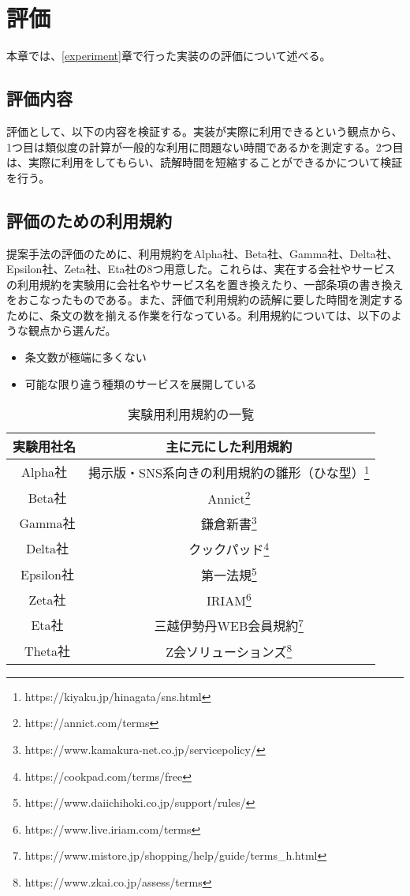 \chapter{評価}
\label{discussion}
本章では、\ref{experiment}章で行った実装のの評価について述べる。

\section{評価内容}
評価として、以下の内容を検証する。実装が実際に利用できるという観点から、1つ目は類似度の計算が一般的な利用に問題ない時間であるかを測定する。2つ目は、実際に利用をしてもらい、読解時間を短縮することができるかについて検証を行う。

\section{評価のための利用規約}
提案手法の評価のために、利用規約をAlpha社、Beta社、Gamma社、Delta社、Epsilon社、Zeta社、Eta社の8つ用意した。これらは、実在する会社やサービスの利用規約を実験用に会社名やサービス名を置き換えたり、一部条項の書き換えをおこなったものである。また、評価で利用規約の読解に要した時間を測定するために、条文の数を揃える作業を行なっている。利用規約については、以下のような観点から選んだ。
\begin{itemize}
  \item 条文数が極端に多くない
  \item 可能な限り違う種類のサービスを展開している
\end{itemize}

\begin{table}[h]
  \centering
  \caption{実験用利用規約の一覧}
  \begin{tabular}{cc}
  \hline
  実験用社名    & 主に元にした利用規約\\ \hline\hline
  Alpha社   & 掲示版・SNS系向きの利用規約の雛形（ひな型）\footnote{https://kiyaku.jp/hinagata/sns.html}\\ \hline\
  Beta社    & Annict\footnote{https://annict.com/terms}\\ \hline\
  Gamma社   & 鎌倉新書\footnote{https://www.kamakura-net.co.jp/servicepolicy/}\\ \hline\
  Delta社   & クックパッド\footnote{https://cookpad.com/terms/free}\\ \hline\
  Epsilon社 & 第一法規\footnote{https://www.daiichihoki.co.jp/support/rules/}\\ \hline\
  Zeta社    & IRIAM\footnote{https://www.live.iriam.com/terms}\\ \hline\
  Eta社     & 三越伊勢丹WEB会員規約\footnote{https://www.mistore.jp/shopping/help/guide/terms\_h.html}\\ \hline\
  Theta社   & Z会ソリューションズ\footnote{https://www.zkai.co.jp/assess/terms}\\ \hline
  \end{tabular}
  \end{table}



